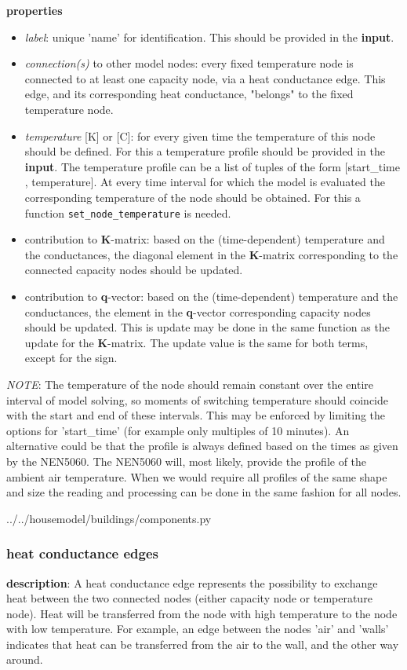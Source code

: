 \textbf{properties}
\begin{itemize}
	\item \emph{label}: unique 'name' for identification. This should be provided in the \textbf{input}.
	\item \emph{connection(s)} to other model nodes: every fixed temperature node is connected to at least one capacity node, via a heat conductance edge. This edge, and its corresponding heat conductance, "belongs" to the fixed temperature node.
	\item \emph{temperature} [K] or [\degree C]: for every given time the temperature of this node should be defined. For this a temperature profile should be provided in the \textbf{input}. The temperature profile can be a list of tuples of the form [start\_time , temperature]. At every time interval for which the model is evaluated the corresponding temperature of the node should be obtained. For this a function \texttt{set\_node\_temperature} is needed. 
	\item contribution to \textbf{K}-matrix: based on the (time-dependent) temperature and the conductances, the diagonal element in the \textbf{K}-matrix corresponding to the connected capacity nodes should be updated.
	\item contribution to \textbf{q}-vector: based on the (time-dependent) temperature and the conductances, the element in the \textbf{q}-vector corresponding capacity nodes should be updated. This is update may be done in the same function as the update for the \textbf{K}-matrix. The update value is the same for both terms, except for the sign. 
\end{itemize}
\emph{NOTE}: The temperature of the node should remain constant over the entire interval of model solving, so moments of switching temperature should coincide with the start and end of these intervals. This may be enforced by limiting the options for 'start\_time' (for example only multiples of 10 minutes). An alternative could be that the profile is always defined based on the times as given by the NEN5060. The NEN5060 will, most likely, provide the profile of the ambient air temperature. When we would require all profiles of the same shape and size the reading and processing can be done in the same fashion for all nodes. 

 
{../../housemodel/buildings/components.py}

\subsubsection{heat conductance edges}
\textbf{description}: A heat conductance edge represents the possibility to exchange heat between the two connected nodes (either capacity node or temperature node). Heat will be transferred from the node with high temperature to the node with low temperature. For example, an edge between the nodes 'air' and 'walls' indicates that heat can be transferred from the air to the wall, and the other way around.  

